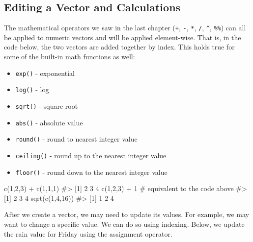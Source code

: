 \documentclass[
  letterpaper,
]{krantz}
\makeatletter
\newenvironment{Shaded}{\begin{snugshade}}{\end{snugshade}}
\newcommand{\CommentTok}[1]{\textcolor[rgb]{0.37,0.37,0.37}{#1}}
\newcommand{\DecValTok}[1]{\textcolor[rgb]{0.68,0.00,0.00}{#1}}
\newcommand{\FunctionTok}[1]{\textcolor[rgb]{0.28,0.35,0.67}{#1}}
\newcommand{\NormalTok}[1]{\textcolor[rgb]{0.00,0.23,0.31}{#1}}
\newcommand{\SpecialCharTok}[1]{\textcolor[rgb]{0.37,0.37,0.37}{#1}}
\providecommand{\tightlist}{%
  \setlength{\itemsep}{0pt}\setlength{\parskip}{0pt}}\usepackage{longtable,booktabs,array}
\newenvironment{kframe}{%
\medskip{}
\setlength{\fboxsep}{.8em}
 \def\at@end@of@kframe{}%
 \ifinner\ifhmode%
  \def\at@end@of@kframe{\end{minipage}}%
  \begin{minipage}{\columnwidth}%
 \fi\fi%
 \def\FrameCommand##1{\hskip\@totalleftmargin \hskip-\fboxsep
 \colorbox{shadecolor}{##1}\hskip-\fboxsep
     \hskip-\linewidth \hskip-\@totalleftmargin \hskip\columnwidth}%
 \MakeFramed {\advance\hsize-\width
   \@totalleftmargin\z@ \linewidth\hsize
   \@setminipage}}%
 {\par\unskip\endMakeFramed%
 \at@end@of@kframe}
\renewenvironment{Shaded}{\begin{kframe}}{\end{kframe}}
\makeatother
\begin{document}
\hypertarget{editing-a-vector-and-calculations}{%
\subsection{Editing a Vector and
Calculations}\label{editing-a-vector-and-calculations}}

The mathematical operators we saw in the last chapter (\texttt{+},
\texttt{-}, \texttt{*}, \texttt{/}, \texttt{\^{}}, \texttt{\%\%}) can
all be applied to numeric vectors and will be applied element-wise. That
is, in the code below, the two vectors are added together by index. This
holds true for some of the built-in math functions as well:

\begin{itemize}
\tightlist
\item
  \texttt{exp()} - exponential
\item
  \texttt{log()} - log
\item
  \texttt{sqrt()} - square root
\item
  \texttt{abs()} - absolute value
\item
  \texttt{round()} - round to nearest integer value
\item
  \texttt{ceiling()} - round up to the nearest integer value
\item
  \texttt{floor()} - round down to the nearest integer value
\end{itemize}

\begin{Shaded}
\begin{Highlighting}[]
\FunctionTok{c}\NormalTok{(}\DecValTok{1}\NormalTok{,}\DecValTok{2}\NormalTok{,}\DecValTok{3}\NormalTok{) }\SpecialCharTok{+} \FunctionTok{c}\NormalTok{(}\DecValTok{1}\NormalTok{,}\DecValTok{1}\NormalTok{,}\DecValTok{1}\NormalTok{)}
\CommentTok{\#\textgreater{} [1] 2 3 4}
\FunctionTok{c}\NormalTok{(}\DecValTok{1}\NormalTok{,}\DecValTok{2}\NormalTok{,}\DecValTok{3}\NormalTok{) }\SpecialCharTok{+} \DecValTok{1} \CommentTok{\# equivalent to the code above}
\CommentTok{\#\textgreater{} [1] 2 3 4}
\FunctionTok{sqrt}\NormalTok{(}\FunctionTok{c}\NormalTok{(}\DecValTok{1}\NormalTok{,}\DecValTok{4}\NormalTok{,}\DecValTok{16}\NormalTok{))}
\CommentTok{\#\textgreater{} [1] 1 2 4}
\end{Highlighting}
\end{Shaded}

After we create a vector, we may need to update its values. For example,
we may want to change a specific value. We can do so using indexing.
Below, we update the rain value for Friday using the assignment
operator.
\end{document}
